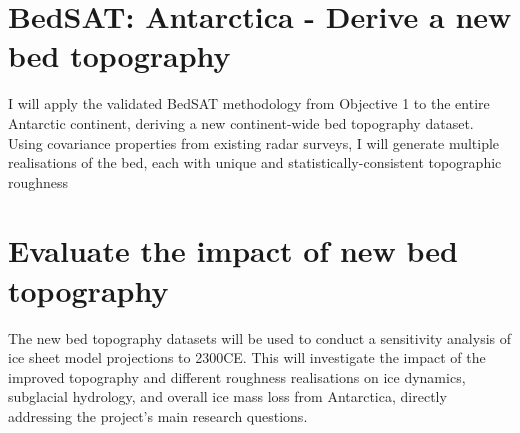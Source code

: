 \section{BedSAT: Antarctica - Derive a new bed topography}
I will apply the validated BedSAT methodology from Objective 1 to the entire Antarctic continent, deriving a new continent-wide bed topography dataset. Using covariance properties from existing radar surveys, I will generate multiple realisations of the bed, each with unique and statistically-consistent topographic roughness%

\section{Evaluate the impact of new bed topography}
The new bed topography datasets will be used to conduct a sensitivity analysis of ice sheet model projections to 2300CE. This will investigate the impact of the improved topography and different roughness realisations on ice dynamics, subglacial hydrology, and overall ice mass loss from Antarctica, directly addressing the project's main research questions.




